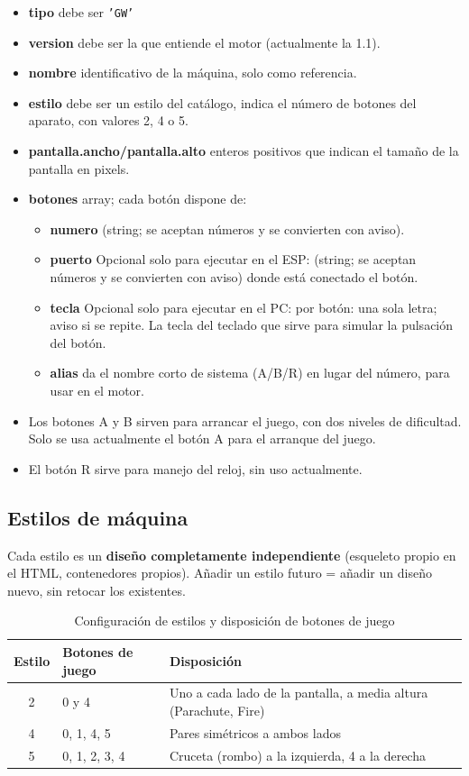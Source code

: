 	\begin{itemize}
		\item \textbf{tipo} debe ser \texttt{'GW'}
		\item \textbf{version} debe ser la que entiende el motor (actualmente la 1.1).
		\item \textbf{nombre} identificativo de la máquina, solo como referencia.
		\item \textbf{estilo} debe ser un estilo del catálogo, indica el número de botones del aparato, con valores 2, 4 o 5.
		\item \textbf{pantalla.ancho/pantalla.alto} enteros positivos que indican el tamaño de la pantalla en pixels.
		\item \textbf{botones} array; cada botón dispone de: 
		\begin{itemize}
			\item \textbf{numero} (string; se aceptan números y se convierten con aviso).
			\item \textbf{puerto} Opcional solo para ejecutar en el ESP: (string; se aceptan números y se convierten con aviso) donde está conectado el botón.
			\item \textbf{tecla} Opcional solo para ejecutar en el PC: por botón: una sola letra; aviso si se repite. La tecla del teclado que sirve para simular la pulsación del botón.
			\item \textbf{alias} da el nombre corto de sistema (A/B/R) en lugar del número, para usar en el motor.
		\end{itemize}
		\item Los botones A y B sirven para arrancar el juego, con dos niveles de dificultad. Solo se usa actualmente el botón A para el arranque del juego.
		\item El botón R sirve para manejo del reloj, sin uso actualmente.
	\end{itemize}
	
	\subsection{Estilos de máquina}
	
	Cada estilo es un \textbf{diseño completamente independiente} (esqueleto propio en el HTML, contenedores propios). Añadir un estilo futuro = añadir un diseño nuevo, sin retocar los existentes.
	
	\begin{table}[htbp]
		\centering
		\caption{Configuración de estilos y disposición de botones de juego}
		\label{tab:estilos_juego}
		\begin{tabular}{|c|l|p{8cm}|}
			\hline
			\textbf{Estilo} & \textbf{Botones de juego} & \textbf{Disposición} \\ \hline \hline
			2 & 0 y 4 & Uno a cada lado de la pantalla, a media altura (Parachute, Fire) \\ \hline
			4 & 0, 1, 4, 5 & Pares simétricos a ambos lados \\ \hline
			5 & 0, 1, 2, 3, 4 & Cruceta (rombo) a la izquierda, 4 a la derecha \\ \hline
		\end{tabular}
	\end{table}
	
